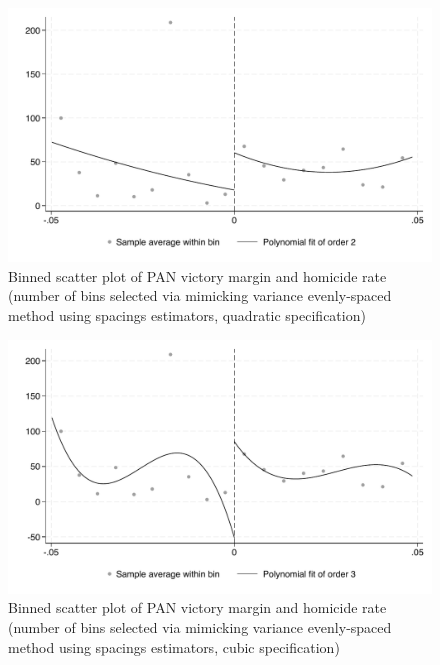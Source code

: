 \documentclass{article}
\begin{document}
\begin{figure}[H]
    \centering
    \includegraphics[scale=0.5]{../outputs/binned_scatter_esmv_quadratic_plot.pdf}
    \caption{Binned scatter plot of PAN victory margin and homicide rate (number of bins selected via mimicking variance evenly-spaced method using spacings estimators, quadratic specification)}
    \label{fig:binned_scatter_esmv_quadratic}
\end{figure}

\begin{figure}[H]
    \centering
    \includegraphics[scale=0.5]{../outputs/binned_scatter_esmv_cubic_plot.pdf}
    \caption{Binned scatter plot of PAN victory margin and homicide rate (number of bins selected via mimicking variance evenly-spaced method using spacings estimators, cubic specification)}
    \label{fig:binned_scatter_esmv_cubic}
\end{figure}
\end{document}
